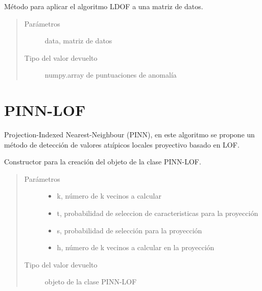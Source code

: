 \documentclass[letterpaper,10pt,spanish]{sphinxmanual}
\begin{document}
\begin{fulllineitems}
Método para aplicar el algoritmo LDOF a una matriz de datos.
\begin{quote}\begin{description}
\item[{Parámetros}] \leavevmode
{} \textendash{} data, matriz de datos

\item[{Tipo del valor devuelto}] \leavevmode
numpy.array de puntuaciones de anomalía

\end{description}\end{quote}

\end{fulllineitems}



\chapter{PINN-LOF}
\label{\detokenize{index:pinn-lof}}
Projection-Indexed Nearest-Neighbour (PINN), en este algoritmo se
propone un método de detección de valores atıípicos
locales proyectivo basado en LOF.


\begin{fulllineitems}
Constructor para la creación del objeto de la clase PINN-LOF.
\begin{quote}\begin{description}
\item[{Parámetros}] \leavevmode\begin{itemize}
\item {} 
 \textendash{} k, número de k vecinos a calcular

\item {} 
 \textendash{} t, probabilidad de seleccion de caracteristicas para la proyección

\item {} 
 \textendash{} s, probabilidad de selección para la proyección

\item {} 
 \textendash{} h, número de k vecinos a calcular en la proyección

\end{itemize}

\item[{Tipo del valor devuelto}] \leavevmode
objeto de la clase PINN-LOF

\end{description}\end{quote}

\end{fulllineitems}
\end{document}
